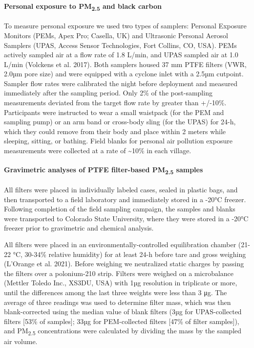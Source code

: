 \documentclass[
  letterpaper,
  DIV=11,
  numbers=noendperiod]{scrartcl}
\let\oldparagraph\paragraph
\renewcommand{\paragraph}[1]{\oldparagraph{#1}\mbox{}}
\begin{document}
\paragraph{\texorpdfstring{Personal exposure to PM\textsubscript{2.5}
and black
carbon}{Personal exposure to PM2.5 and black carbon}}\label{personal-exposure-to-pm2.5-and-black-carbon}

To measure personal exposure we used two types of samplers: Personal
Exposure Monitors (PEMs, Apex Pro; Casella, UK) and Ultrasonic Personal
Aerosol Samplers (UPAS, Access Sensor Technologies, Fort Collins, CO,
USA). PEMs actively sampled air at a flow rate of 1.8 L/min, and UPAS
sampled air at 1.0 L/min (Volckens et al. 2017). Both samplers housed 37
mm PTFE filters (VWR, 2.0µm pore size) and were equipped with a cyclone
inlet with a 2.5µm cutpoint. Sampler flow rates were calibrated the
night before deployment and measured immediately after the sampling
period. Only 2\% of the post-sampling measurements deviated from the
target flow rate by greater than +/-10\%. Participants were instructed
to wear a small waistpack (for the PEM and sampling pump) or an arm band
or cross-body sling (for the UPAS) for 24-h, which they could remove
from their body and place within 2 meters while sleeping, sitting, or
bathing. Field blanks for personal air pollution exposure measurements
were collected at a rate of \textasciitilde10\% in each village.

\paragraph{\texorpdfstring{Gravimetric analyses of PTFE filter-based
PM\textsubscript{2.5}
samples}{Gravimetric analyses of PTFE filter-based PM2.5 samples}}\label{gravimetric-analyses-of-ptfe-filter-based-pm2.5-samples}

All filters were placed in individually labeled cases, sealed in plastic
bags, and then transported to a field laboratory and immediately stored
in a -20°C freezer. Following completion of the field sampling campaign,
the samples and blanks were transported to Colorado State University,
where they were stored in a -20°C freezer prior to gravimetric and
chemical analysis.

All filters were placed in an environmentally-controlled equilibration
chamber (21-22 °C, 30-34\% relative humidity) for at least 24-h before
tare and gross weighing (L'Orange et al. 2021). Before weighing we
neutralized static charges by passing the filters over a polonium-210
strip. Filters were weighed on a microbalance (Mettler Toledo Inc.,
XS3DU, USA) with 1µg resolution in triplicate or more, until the
differences among the last three weights were less than 3 μg. The
average of three readings was used to determine filter mass, which was
then blank-corrected using the median value of blank filters (3µg for
UPAS-collected filters {[}53\% of samples{]}; 33µg for PEM-collected
filters {[}47\% of filter samples{]}), and PM\textsubscript{2.5}
concentrations were calculated by dividing the mass by the sampled air
volume.
\end{document}
